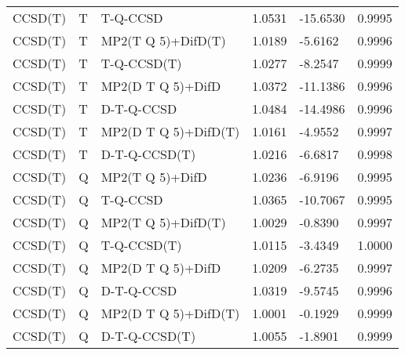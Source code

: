 \begin{table}
\begin{tabular}{l l l l l l }
    CCSD(T) & T & T-Q-CCSD & 1.0531 & -15.6530 & 0.9995 \\ 
    CCSD(T) & T & MP2(T Q 5)+DifD(T) & 1.0189 & -5.6162 & 0.9996 \\ 
    CCSD(T) & T & T-Q-CCSD(T) & 1.0277 & -8.2547 & 0.9999 \\ 
    CCSD(T) & T & MP2(D T Q 5)+DifD & 1.0372 & -11.1386 & 0.9996 \\ 
    CCSD(T) & T & D-T-Q-CCSD & 1.0484 & -14.4986 & 0.9996 \\ 
    CCSD(T) & T & MP2(D T Q 5)+DifD(T) & 1.0161 & -4.9552 & 0.9997 \\ 
    CCSD(T) & T & D-T-Q-CCSD(T) & 1.0216 & -6.6817 & 0.9998 \\ 
    CCSD(T) & Q & MP2(T Q 5)+DifD & 1.0236 & -6.9196 & 0.9995 \\ 
    CCSD(T) & Q & T-Q-CCSD & 1.0365 & -10.7067 & 0.9995 \\ 
    CCSD(T) & Q & MP2(T Q 5)+DifD(T) & 1.0029 & -0.8390 & 0.9997 \\ 
    CCSD(T) & Q & T-Q-CCSD(T) & 1.0115 & -3.4349 & 1.0000 \\ 
    CCSD(T) & Q & MP2(D T Q 5)+DifD & 1.0209 & -6.2735 & 0.9997 \\ 
    CCSD(T) & Q & D-T-Q-CCSD & 1.0319 & -9.5745 & 0.9996 \\ 
    CCSD(T) & Q & MP2(D T Q 5)+DifD(T) & 1.0001 & -0.1929 & 0.9999 \\ 
    CCSD(T) & Q & D-T-Q-CCSD(T) & 1.0055 & -1.8901 & 0.9999 \\ 
    \hline
  \end{tabular}
\end{table}
